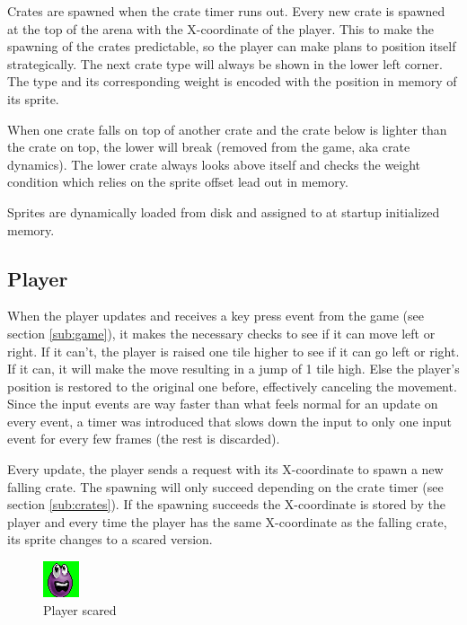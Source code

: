 \documentclass[]{article}
\begin{document}
Crates are spawned when the crate timer runs out. Every new crate is spawned
at the top of the arena with the X-coordinate of the player. This to make
the spawning of the crates predictable, so the player can make plans to
position itself strategically. The next crate type will always be shown in the 
lower left corner. The type and its corresponding weight is encoded with the
position in memory of its sprite.

When one crate falls on top of another crate and the crate below is lighter
than the crate on top, the lower will break (removed from the game, aka crate
dynamics). The lower crate always looks above itself and checks the weight 
condition which relies on the sprite offset lead out in memory.

Sprites are dynamically loaded from disk and assigned to at startup initialized
memory.

\subsection{Player}%
\label{sub:player}

When the player updates and receives a key press event from the game (see
section \ref{sub:game}), it makes the necessary checks to see if it can move
left or right. If it can't, the player is raised one tile higher to see if it
can go left or right. If it can, it will make the move resulting in a jump of
1 tile high. Else the player's position is restored to the original one before,
effectively canceling the movement. Since the input events are way faster than
what feels normal for an update on every event, a timer was introduced that
slows down the input to only one input event for every few frames (the rest 
is discarded).

Every update, the player sends a request with its X-coordinate to spawn a new
falling crate. The spawning will only succeed depending on the crate timer 
(see section \ref{sub:crates}). If the spawning succeeds the X-coordinate is
stored by the player and every time the player has the same X-coordinate as 
the falling crate, its sprite changes to a scared version.

\begin{figure}[htpb]
    \centering
    \includegraphics[width=0.2\linewidth]{../sprites/Lazarus_squished.png}
    \caption{Player scared}%
\end{figure}
\end{document}
